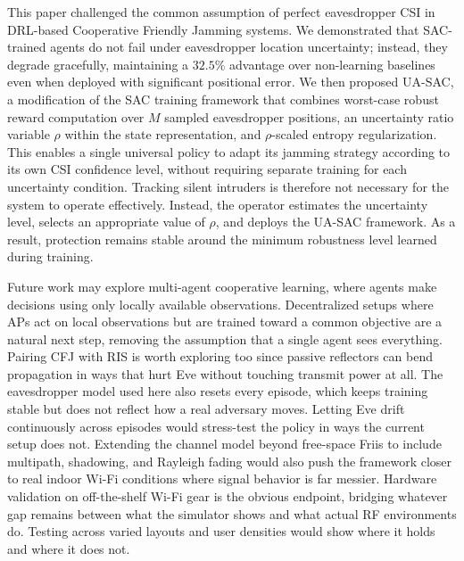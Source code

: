 \documentclass[conference]{IEEEtran}
\begin{document}
This paper challenged the common assumption of perfect eavesdropper CSI in DRL-based Cooperative Friendly Jamming systems. We demonstrated that SAC-trained agents do not fail under eavesdropper location uncertainty; instead, they degrade gracefully, maintaining a $32.5\%$ advantage over non-learning baselines even when deployed with significant positional error. We then proposed UA-SAC, a modification of the SAC training framework that combines worst-case robust reward computation over $M$ sampled eavesdropper positions, an uncertainty ratio variable $\rho$ within the state representation, and $\rho$-scaled entropy regularization. This enables a single universal policy to adapt its jamming strategy according to its own CSI confidence level, without requiring separate training for each uncertainty condition. Tracking silent intruders is therefore not necessary for the system to operate effectively. Instead, the operator estimates the uncertainty level, selects an appropriate value of $\rho$, and deploys the UA-SAC framework. As a result, protection remains stable around the minimum robustness level learned during training.

Future work may explore multi-agent cooperative learning, where agents make decisions using only locally available observations. Decentralized setups where APs act on local observations but are trained toward a common objective are a natural next step, removing the assumption that a single agent sees everything. Pairing CFJ with RIS is worth exploring too since passive reflectors can bend propagation in ways that hurt Eve without touching transmit power at all. The eavesdropper model used here also resets every episode, which keeps training stable but does not reflect how a real adversary moves. Letting Eve drift continuously across episodes would stress-test the policy in ways the current setup does not. Extending the channel model beyond free-space Friis to include multipath, shadowing, and Rayleigh fading would also push the framework closer to real indoor Wi-Fi conditions where signal behavior is far messier. Hardware validation on off-the-shelf Wi-Fi gear is the obvious endpoint, bridging whatever gap remains between what the simulator shows and what actual RF environments do. Testing across varied layouts and user densities would show where it holds and where it does not.


\end{document}
